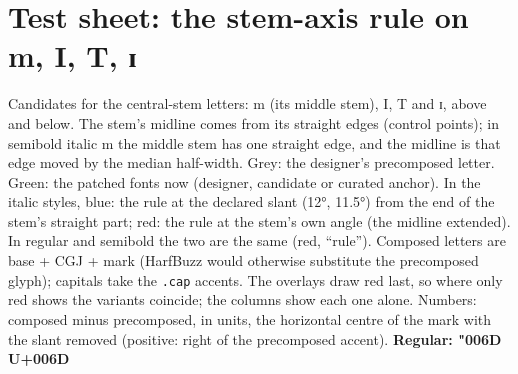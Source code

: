 \documentclass[10pt]{article}
\begin{document}
\section*{Test sheet: the stem-axis rule on m, I, T, ɪ}
Candidates for the central-stem letters: m (its middle stem), I, T and ɪ, above and below.
The stem's midline comes from its straight edges (control points); in semibold italic m the middle stem has one straight edge, and the midline is that edge moved by the median half-width.
{\color{pre}Grey}: the designer's precomposed letter. {\color{now}Green}: the patched fonts now (designer, candidate or curated anchor).
In the italic styles, {\color{dec}blue}: the rule at the declared slant (12°, 11.5°) from the end of the stem's straight part; {\color{own}red}: the rule at the stem's own angle (the midline extended).
In regular and semibold the two are the same ({\color{own}red}, ``rule'').
Composed letters are base + CGJ + mark (HarfBuzz would otherwise substitute the precomposed glyph); capitals take the \verb|.cap| accents.
The overlays draw red last, so where only red shows the variants coincide; the columns show each one alone.
Numbers: composed minus precomposed, in units, the horizontal centre of the mark with the slant removed (positive: right of the precomposed accent).
\clearpage\textbf{Regular: {\NowRegular \char"006D} U+006D}\par
\end{document}
